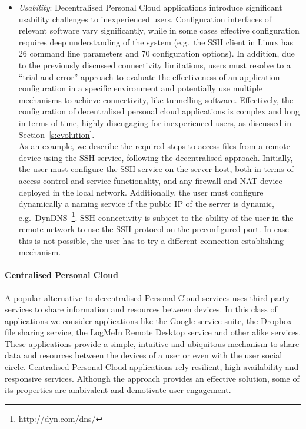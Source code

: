 \begin{itemize}
  \item {\it Usability}\/: Decentralised Personal Cloud applications introduce
    significant usability challenges to inexperienced users. Configuration
    interfaces of relevant software vary significantly, while in some cases
    effective configuration requires deep understanding of the system (e.g.~the
    SSH client in Linux has 26 command line parameters and 70 configuration
    options).  In addition, due to the previously discussed connectivity
    limitations, users must resolve to a ``trial and error'' approach to
    evaluate the effectiveness of an application configuration in a specific
    environment and potentially use multiple mechanisms to achieve
    connectivity, like tunnelling software.  Effectively, the configuration of
    decentralised personal cloud applications is complex and long in terms of
    time,  highly disengaging for inexperienced users, as discussed in
    Section~\ref{s:evolution}.\\ 
    As an example, we describe the required steps to access files from a remote
    device using the SSH service, following the decentralised approach. Initially,
    the user must configure the SSH service on the server host, both in terms of
    access control and service functionality, and any firewall and NAT device
    deployed in the local network. Additionally, the user must configure
    dynamically a naming service if the public IP of the server is dynamic,
    e.g.~DynDNS~\footnote{\url{http://dyn.com/dns/}}\@.  SSH connectivity is
    subject to the ability of the user in the remote network to use the SSH
    protocol on the preconfigured port.  In case this is not possible, the
    user has to try a different connection establishing mechanism.
\end{itemize}

\paragraph*{Centralised Personal Cloud}

A popular alternative to decentralised Personal Cloud services uses third-party
services to share information and resources between devices.  In this class of
applications we consider applications like the Google service suite, the Dropbox
file sharing service, the LogMeIn Remote Desktop service and other alike
services.  These applications provide a simple, intuitive and ubiquitous
mechanism to share data and resources between the devices of a user or even with
the user social circle.  Centralised Personal Cloud applications rely resilient,
high availability and responsive services.  Although the approach provides an
effective solution, some of its properties are ambivalent and demotivate user
engagement. 

